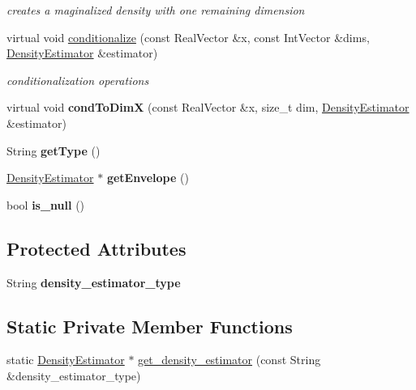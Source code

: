 \begin{DoxyCompactItemize}
\begin{DoxyCompactList}\small\item\em creates a maginalized density with one remaining dimension \end{DoxyCompactList}\item 
virtual void \hyperlink{classPecos_1_1DensityEstimator_a48a43dfe8975d003c2c7cff695046414}{conditionalize} (const Real\+Vector \&x, const Int\+Vector \&dims, \hyperlink{classPecos_1_1DensityEstimator}{Density\+Estimator} \&estimator)\label{classPecos_1_1DensityEstimator_a48a43dfe8975d003c2c7cff695046414}

\begin{DoxyCompactList}\small\item\em conditionalization operations \end{DoxyCompactList}\item 
virtual void {\bfseries cond\+To\+DimX} (const Real\+Vector \&x, size\+\_\+t dim, \hyperlink{classPecos_1_1DensityEstimator}{Density\+Estimator} \&estimator)\label{classPecos_1_1DensityEstimator_aa4b4c620def1d4611d3e10dcd4b3a073}

\item 
String {\bfseries get\+Type} ()\label{classPecos_1_1DensityEstimator_a68adac94351807681f1b2828b9c68734}

\item 
\hyperlink{classPecos_1_1DensityEstimator}{Density\+Estimator} $\ast$ {\bfseries get\+Envelope} ()\label{classPecos_1_1DensityEstimator_a3b6f140849ddd8d260b08912f0ddde32}

\item 
bool {\bfseries is\+\_\+null} ()\label{classPecos_1_1DensityEstimator_a20a65eada5e4846ec27c12dd7166adec}

\end{DoxyCompactItemize}
\subsection*{Protected Attributes}
\begin{DoxyCompactItemize}
\item 
String {\bfseries density\+\_\+estimator\+\_\+type}\label{classPecos_1_1DensityEstimator_ab95f5d8568c1ff1e0a02a408fedb00eb}

\end{DoxyCompactItemize}
\subsection*{Static Private Member Functions}
\begin{DoxyCompactItemize}
\item 
static \hyperlink{classPecos_1_1DensityEstimator}{Density\+Estimator} $\ast$ \hyperlink{classPecos_1_1DensityEstimator_a531bb898be601c8a9e061574b536b1a4}{get\+\_\+density\+\_\+estimator} (const String \&density\+\_\+estimator\+\_\+type)
\end{DoxyCompactItemize}
